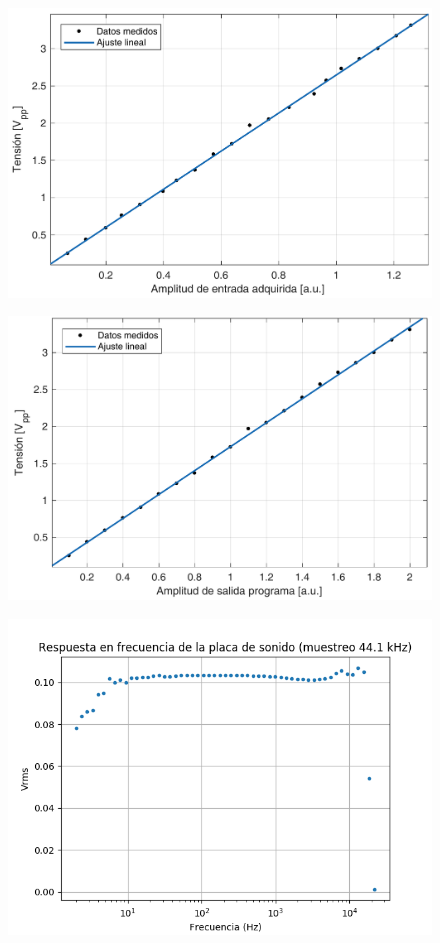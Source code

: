 \documentclass[a4paper,11pt]{article}
\begin{document}
	\begin{figure}[h]
		\centering
		\includegraphics[width=\textwidth]{imagenes/CalibracionEntrada.pdf}
		\caption{}
	\end{figure}
	
	\begin{figure}[h]
		\centering
		\includegraphics[width=\textwidth]{imagenes/CalibracionSalida.pdf}
		\caption{}
	\end{figure}
	
	\begin{figure}[h]
		\centering
		\includegraphics[width=\textwidth]{imagenes/bode44k1Hz.png}
		\caption{}
	\end{figure}
\end{document}
